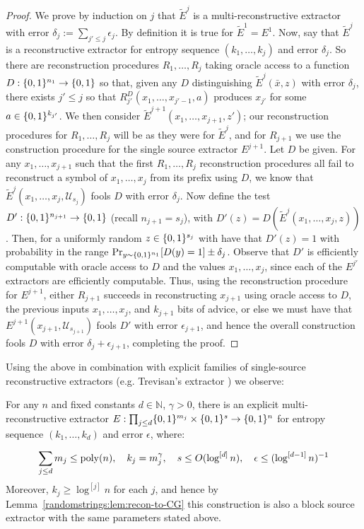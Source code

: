 \begin{proof}
We prove by induction on $j$ that $\tilde{E}^j$ is a multi-reconstructive extractor with error $\delta_j:=\sum_{j' \leq j} \epsilon_j$. By definition it is true for $\tilde{E}^1 = E^1$. 
Now, say that $\tilde{E}^j$ is a reconstructive extractor for entropy sequence $(k_1,\ldots,k_j)$ and error $\delta_j$. So there are reconstruction procedures $R_1,\ldots,R_j$ taking oracle access to a function $D: \{0,1\}^{n_1} \to \{0,1\}$ so that, given any $D$ distinguishing $\tilde{E}^{j}(\bar{x}, z)$ with error $\delta_j$, there exists $j' \leq j$ so that $R_{j'}^D(x_1,\ldots,x_{j'-1}, a)$ produces $x_{j'}$ for some $a \in \{0,1\}^{k_{j'}}$. We then consider $\tilde{E}^{j+1}(x_1,\ldots,x_{j+1},z')$; our reconstruction procedures for $R_1,\ldots,R_j$ will be as they were for $\tilde{E}^{j}$, and for $R_{j+1}$ we use the construction procedure for the single source extractor $E^{j+1}$. 
Let $D$ be given. For any $x_1,\ldots,x_{j+1}$ such that the first $R_1,\ldots,R_j$ reconstruction procedures all fail to reconstruct a symbol of $x_1,\ldots,x_{j}$ from its prefix using $D$, we know that $\tilde{E}^{j}(x_1,\ldots,x_{j}, \mathcal{U}_{s_j})$ fools $D$ with error $\delta_j$. Now define the test $D' :\{0,1\}^{n_{j+1}}\to \{0,1\}$ (recall $n_{j+1} = s_j$), with $D'(z)= D(\tilde{E}^{j}(x_1,\ldots,x_{j}, z))$. Then, for a uniformly random $z \in \{0,1\}^{s_j}$ with have that $D'(z) = 1$ with probability in the range $\Pr_{y \sim \{0,1\}^{n_1}}[D(y)=1] \pm \delta_j$. Observe that $D'$ is efficiently computable with oracle access to $D$ and the values $x_1,\ldots,x_j$, since each of the $E^{j'}$ extractors are efficiently computable. Thus, using the reconstruction procedure for $E^{j+1}$, either $R_{j+1}$ succeeds in reconstructing $x_{j+1}$ using oracle access to $D$, the previous inputs $x_1,\ldots,x_j$, and $k_{j+1}$ bits of advice, or else we must have that $E^{j+1}(x_{j+1}, \mathcal{U}_{s_{j+1}})$ fools $D'$ with error $\epsilon_{j+1}$, and hence the overall construction fools $D$ with error $\delta_j + \epsilon_{j+1}$, completing the proof.
\end{proof}

Using the above in combination with explicit families of single-source reconstructive extractors (e.g. Trevisan's extractor \cite{trevisan}) we observe: 

\begin{corollary}
For any $n$ and fixed constants $d\in \mathbb{N}$, $\gamma >0$, there is an explicit multi-reconstructive extractor $E: \prod_{j \leq d} \{0,1\}^{m_j} \times \{0,1\}^s \to \{0,1\}^n$ for entropy sequence $(k_1,\ldots,k_d)$ and error $\epsilon$, where: 

\[
\sum_{j\leq d} m_j \leq \mathrm{poly}(n), \quad k_j =  m_j^{\gamma}, \quad s \leq O(\log^{[d]}n), \quad \epsilon \leq (\log^{[d-1]}n)^{-1}
\]
Moreover, $k_j \geq \log^{[j]}n$ for each $j$, and hence by Lemma~\ref{randomstrings:lem:recon-to-CG} this construction is also a block source extractor with the same parameters stated above.
\end{corollary}


